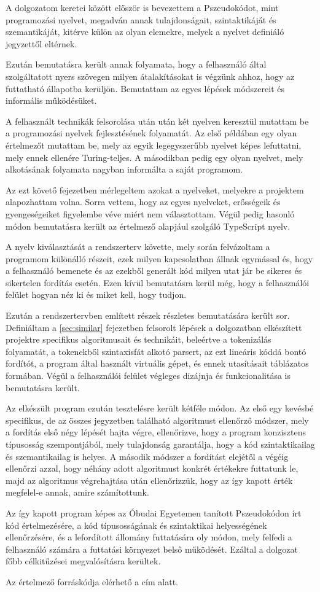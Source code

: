 A dolgozatom keretei között először is bevezettem a Pszeudokódot, mint programozási nyelvet, megadván annak tulajdonságait, szintaktikáját és szemantikáját, kitérve külön az olyan elemekre, melyek a nyelvet definiáló jegyzettől eltérnek.

Ezután bemutatásra került annak folyamata, hogy a felhasználó által szolgáltatott nyers szövegen milyen átalakításokat is végzünk ahhoz, hogy az futtatható állapotba kerüljön. Bemutattam az egyes lépések módszereit és informális működésüket.

A felhasznált technikák felsorolása után után két nyelven keresztül mutattam be a programozási nyelvek fejlesztésének folyamatát. Az első példában egy olyan értelmezőt mutattam be, mely az egyik legegyszerűbb nyelvet képes lefuttatni, mely ennek ellenére Turing-teljes. A másodikban pedig egy olyan nyelvet, mely alkotásának folyamata nagyban informálta a saját programom.

Az ezt követő fejezetben mérlegeltem azokat a nyelveket, melyekre a projektem alapozhattam volna. Sorra vettem, hogy az egyes nyelveket, erősségeik és gyengeségeiket figyelembe véve miért nem választottam. Végül pedig hasonló módon bemutatásra került az értelmező alapjául szolgáló TypeScript nyelv.

A nyelv kiválasztását a rendszerterv követte, mely során felvázoltam a programom különálló részeit, ezek milyen kapcsolatban állnak egymással és, hogy a felhasználó bemenete és az ezekből generált kód milyen utat jár be sikeres és sikertelen fordítás esetén. Ezen kívül bemutatásra kerül még, hogy a felhasználói felület hogyan néz ki és miket kell, hogy tudjon.

Ezután a rendszertervben említett részek részletes bemutatására került sor. Definiáltam a \ref{sec:similar} fejezetben felsorolt lépések a dolgozatban elkészített projektre specifikus algoritmusait és technikáit, beleértve a tokenizálás folyamatát, a tokenekből szintaxisfát alkotó parsert, az ezt lineáris kóddá bontó fordítót, a program által használt virtuális gépet, és ennek utasításait táblázatos formában. Végül a felhasználói felület végleges dizájnja és funkcionalitása is bemutatásra került.

Az elkészült program ezután tesztelésre került kétféle módon. Az első egy kevésbé specifikus, de az összes jegyzetben található algoritmust ellenőrző módszer, mely a fordítás első négy lépését hajta végre, ellenőrizve, hogy a program konzisztens típusosság szempontjából, mely tulajdonság garantálja, hogy a kód szintaktikailag és szemantikailag is helyes. A második módszer a fordítást elejétől a végéig ellenőrzi azzal, hogy néhány adott algoritmust konkrét értékekre futtatunk le, majd az algoritmus végrehajtása után ellenőrizzük, hogy az így kapott érték megfelel-e annak, amire számítottunk.

Az így kapott program képes az Óbudai Egyetemen tanított Pszeudokódon írt kód értelmezésére, a kód típusosságának és szintaktikai helyességének ellenőrzésére, és a lefordított állomány futtatására oly módon, mely felfedi a felhasználó számára a futtatási környezet belső működését. Ezáltal a dolgozat főbb célkitűzései megvalósításra kerültek.

Az értelmező forráskódja elérhető a {\color{blue}{https://github.com/Nemin32/pseudokod}} cím alatt.
